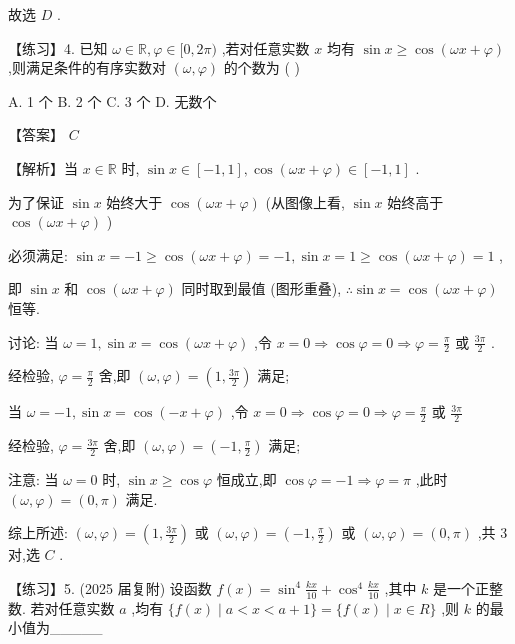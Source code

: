 \documentclass[10pt]{article}
\begin{document}
故选 \(D\) .

【练习】4. 已知 \(\omega  \in  \mathbb{R},\varphi  \in  \lbrack 0,{2\pi })\) ,若对任意实数 \(x\) 均有 \(\sin x \geq  \cos \left( {{\omega x} + \varphi }\right)\) ,则满足条件的有序实数对 \(\left( {\omega ,\varphi }\right)\) 的个数为 ( )

A. 1 个 B. 2 个 C. 3 个 D. 无数个

【答案】 \(C\)

【解析】当 \(x \in  \mathbb{R}\) 时, \(\sin x \in  \left\lbrack  {-1,1}\right\rbrack  ,\cos \left( {{\omega x} + \varphi }\right)  \in  \left\lbrack  {-1,1}\right\rbrack\) .

为了保证 \(\sin x\) 始终大于 \(\cos \left( {{\omega x} + \varphi }\right)\) (从图像上看, \(\sin x\) 始终高于 \(\cos \left( {{\omega x} + \varphi }\right)\) )

必须满足: \(\sin x =  - 1 \geq  \cos \left( {{\omega x} + \varphi }\right)  =  - 1,\sin x = 1 \geq  \cos \left( {{\omega x} + \varphi }\right)  = 1\) ,

即 \(\sin x\) 和 \(\cos \left( {{\omega x} + \varphi }\right)\) 同时取到最值 (图形重叠), \(\therefore \sin x = \cos \left( {{\omega x} + \varphi }\right)\) 恒等.

讨论: 当 \(\omega  = 1,\sin x = \cos \left( {{\omega x} + \varphi }\right)\) ,令 \(x = 0 \Rightarrow  \cos \varphi  = 0 \Rightarrow  \varphi  = \frac{\pi }{2}\) 或 \(\frac{3\pi }{2}\) .

经检验, \(\varphi  = \frac{\pi }{2}\) 舍,即 \(\left( {\omega ,\varphi }\right)  = \left( {1,\frac{3\pi }{2}}\right)\) 满足;

当 \(\omega  =  - 1,\sin x = \cos \left( {-x + \varphi }\right)\) ,令 \(x = 0 \Rightarrow  \cos \varphi  = 0 \Rightarrow  \varphi  = \frac{\pi }{2}\) 或 \(\frac{3\pi }{2}\)

经检验, \(\varphi  = \frac{3\pi }{2}\) 舍,即 \(\left( {\omega ,\varphi }\right)  = \left( {-1,\frac{\pi }{2}}\right)\) 满足;

注意: 当 \(\omega  = 0\) 时, \(\sin x \geq  \cos \varphi\) 恒成立,即 \(\cos \varphi  =  - 1 \Rightarrow  \varphi  = \pi\) ,此时 \(\left( {\omega ,\varphi }\right)  = \left( {0,\pi }\right)\) 满足.

综上所述: \(\left( {\omega ,\varphi }\right)  = \left( {1,\frac{3\pi }{2}}\right)\) 或 \(\left( {\omega ,\varphi }\right)  = \left( {-1,\frac{\pi }{2}}\right)\) 或 \(\left( {\omega ,\varphi }\right)  = \left( {0,\pi }\right)\) ,共 3 对,选 \(C\) .

【练习】5. (2025 届复附) 设函数 \(f\left( x\right)  = {\sin }^{4}\frac{kx}{10} + {\cos }^{4}\frac{kx}{10}\) ,其中 \(k\) 是一个正整数. 若对任意实数 \(a\) ,均有 \(\{ f\left( x\right)  \mid  a < x < a + 1\}  = \{ f\left( x\right)  \mid  x \in  R\}\) ,则 \(k\) 的最小值为\_\_\_\_\_
\end{document}
